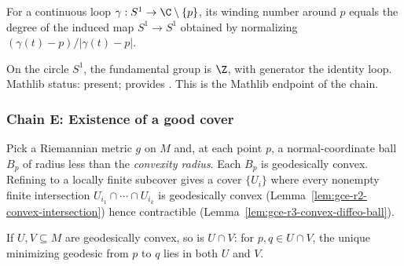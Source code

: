 \begin{lemma}
\label{lem:rado-dim2-r4-winding-degree}
For a continuous loop $\gamma : S^{1} \to \C \setminus \{p\}$,
its winding number around $p$ equals the degree of the induced
map $S^{1} \to S^{1}$ obtained by normalizing
$(\gamma(t)-p)/|\gamma(t)-p|$.
\leanok\mathlibok
\end{lemma}

\begin{lemma}[Pass C.5: $\pi_{1}(S^{1}) = \Z$]
On the circle $S^{1}$, the fundamental group is $\Z$, with
generator the identity loop.  Mathlib status: present;
 provides
.  This is the
Mathlib endpoint of the chain.
\label{lem:rado-dim2-r5-pi1-circle}
\leanok\mathlibok
\end{lemma}

\subsubsection*{Chain E: Existence of a good cover}

\begin{lemma}
\label{lem:gce-r1-convex-normal-cover}
Pick a Riemannian metric $g$ on $M$ and, at each point $p$, a
normal-coordinate ball $B_{p}$ of radius less than the
\emph{convexity radius}.  Each $B_{p}$ is geodesically convex.
Refining to a locally finite subcover gives a cover $\{U_{i}\}$
where every nonempty finite intersection $U_{i_{1}} \cap \cdots
\cap U_{i_{k}}$ is geodesically convex (Lemma~\ref{lem:gce-r2-convex-intersection})
hence contractible (Lemma~\ref{lem:gce-r3-convex-diffeo-ball}).
\leanok
\end{lemma}

\begin{lemma}
\label{lem:gce-r2-convex-intersection}
If $U, V \subseteq M$ are geodesically convex, so is $U \cap V$:
for $p, q \in U \cap V$, the unique minimizing geodesic from $p$
to $q$ lies in both $U$ and $V$.
\leanok\mathlibok
\end{lemma}

